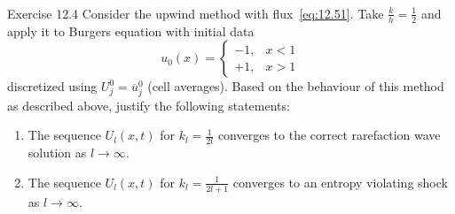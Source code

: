 

\begin{frame}
    \frametitle{\secname}

    \begin{alertblock}{Exercise 12.4}
        Consider the upwind method with flux~\eqref{eq:12.51}.
        Take
        \begin{math}
            \frac{k}{h}=
            \frac{1}{2}
        \end{math}
        and apply it to Burgers
        equation with initial data
        \begin{equation}\tag{12.56}\label{eq:12.56}
            u_{0}
            \left(x\right)=
            \begin{cases}
                -1,
                 & x<1 \\
                +1,
                 & x>1
            \end{cases}
        \end{equation}
        discretized using
        \begin{math}
            U^{0}_{j}=
            \overline{u}^{0}_{j}
        \end{math}
        (cell averages).
        Based on the behaviour of this method as described above,
        justify the following statements:
        \begin{enumerate}
            \item

                  The sequence
                  \begin{math}
                      U_{l}
                      \left(x,t\right)
                  \end{math}
                  for
                  \begin{math}
                      k_{l}=
                      \frac{1}{2l}
                  \end{math}
                  converges to the correct rarefaction wave solution
                  as $l\to\infty$.

            \item

                  The sequence
                  \begin{math}
                      U_{l}
                      \left(x,t\right)
                  \end{math}
                  for
                  \begin{math}
                      k_{l}=
                      \frac{1}{2l+1}
                  \end{math}
                  converges to an entropy violating shock as
                  $l\to\infty$.


\end{enumerate}
\end{alertblock}
\end{frame}

